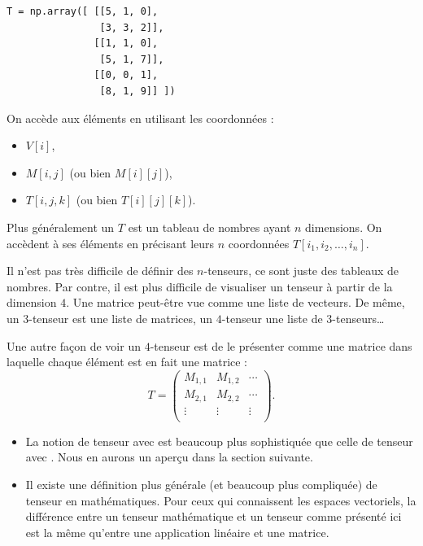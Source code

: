 \documentclass[11pt,class=report,crop=false]{standalone}
\begin{document}
\medskip

\begin{minipage}{0.4\textwidth}
\end{minipage}
\begin{minipage}{0.4\textwidth}
\begin{lstlisting}
T = np.array([ [[5, 1, 0], 
	            [3, 3, 2]],
	           [[1, 1, 0], 
	            [5, 1, 7]], 
	           [[0, 0, 1], 
	            [8, 1, 9]] ])
\end{lstlisting}
\end{minipage}


\medskip

On accède aux éléments en utilisant les coordonnées :
\begin{itemize}
  \item $V[i]$,
  \item $M[i,j]$ (ou bien $M[i][j]$),
  \item $T[i,j,k]$ (ou bien $T[i][j][k]$).
\end{itemize}

Plus généralement un  $T$ est un tableau de nombres ayant $n$ dimensions.
On accèdent à ses éléments en précisant leurs $n$ coordonnées $T[i_1,i_2,\ldots,i_n]$.

Il n'est pas très difficile de définir des $n$-tenseurs, ce sont juste des tableaux de nombres. Par contre, il est plus difficile de visualiser un tenseur à partir de la dimension $4$.
Une matrice peut-être vue comme une liste de vecteurs. De même, un $3$-tenseur est une liste de matrices, un $4$-tenseur une liste de $3$-tenseurs\ldots

Une autre façon de voir un $4$-tenseur est de le présenter comme une matrice dans laquelle chaque élément est en fait une matrice :
$$T = \begin{pmatrix}
M_{1,1} & M_{1,2} & \cdots \\
M_{2,1} & M_{2,2} & \cdots \\
\vdots & \vdots   & \vdots \\
\end{pmatrix}.$$



\begin{remarque*}
\sauteligne
\begin{itemize}

  \item La notion de tenseur avec \tensorflow{} est beaucoup plus sophistiquée que celle de tenseur avec \numpy. Nous en aurons un aperçu dans la section suivante.
  
  \item Il existe une définition plus générale (et beaucoup plus compliquée) de tenseur en mathématiques. Pour ceux qui connaissent les espaces vectoriels, la différence entre un tenseur mathématique et un tenseur comme présenté ici est la même qu'entre une application linéaire et une matrice.
\end{itemize}

\end{remarque*}
\end{document}
